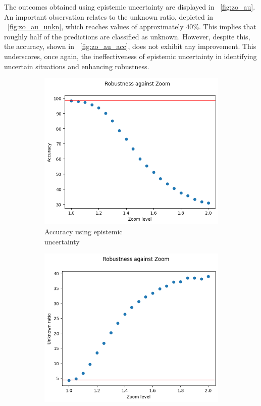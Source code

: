 The outcomes obtained using epistemic uncertainty are displayed in \Fig~\ref{fig:zo_au}. An important observation relates to the unknown ratio, depicted in \Fig~\ref{fig:zo_au_unkn}, which reaches values of approximately $40\%$. This implies that roughly half of the predictions are classified as unknown. However, despite this, the accuracy, shown in \Fig~\ref{fig:zo_au_acc}, does not exhibit any improvement. This underscores, once again, the ineffectiveness of epistemic uncertainty in identifying uncertain situations and enhancing robustness.

\begin{figure}[h]
	\centering
	\begin{subfigure}{.33\textwidth}
		\centering
		\includegraphics[width=0.9\linewidth]{ImageFiles/EvalBNN/ZO/EU/acc}
		\caption{Accuracy using epistemic \\ uncertainty}
		\label{fig:zo_eu_acc}
	\end{subfigure}%
	\begin{subfigure}{.33\textwidth}
		\centering
		\includegraphics[width=0.9\linewidth]{ImageFiles/EvalBNN/ZO/EU/unkn}

\end{subfigure}
\end{figure}
